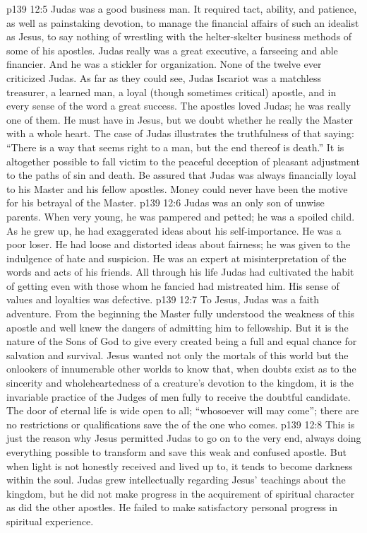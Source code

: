 \pc \vs p139 12:5 Judas was a good business man. It required tact, ability, and patience, as well as painstaking devotion, to manage the financial affairs of such an idealist as Jesus, to say nothing of wrestling with the helter\hyp{}skelter business methods of some of his apostles. Judas really was a great executive, a farseeing and able financier. And he was a stickler for organization. None of the twelve ever criticized Judas. As far as they could see, Judas Iscariot was a matchless treasurer, a learned man, a loyal (though sometimes critical) apostle, and in every sense of the word a great success. The apostles loved Judas; he was really one of them. He must have  in Jesus, but we doubt whether he really  the Master with a whole heart. The case of Judas illustrates the truthfulness of that saying: “There is a way that seems right to a man, but the end thereof is death.” It is altogether possible to fall victim to the peaceful deception of pleasant adjustment to the paths of sin and death. Be assured that Judas was always financially loyal to his Master and his fellow apostles. Money could never have been the motive for his betrayal of the Master.
\vs p139 12:6 Judas was an only son of unwise parents. When very young, he was pampered and petted; he was a spoiled child. As he grew up, he had exaggerated ideas about his self\hyp{}importance. He was a poor loser. He had loose and distorted ideas about fairness; he was given to the indulgence of hate and suspicion. He was an expert at misinterpretation of the words and acts of his friends. All through his life Judas had cultivated the habit of getting even with those whom he fancied had mistreated him. His sense of values and loyalties was defective.
\pc \vs p139 12:7 To Jesus, Judas was a faith adventure. From the beginning the Master fully understood the weakness of this apostle and well knew the dangers of admitting him to fellowship. But it is the nature of the Sons of God to give every created being a full and equal chance for salvation and survival. Jesus wanted not only the mortals of this world but the onlookers of innumerable other worlds to know that, when doubts exist as to the sincerity and wholeheartedness of a creature’s devotion to the kingdom, it is the invariable practice of the Judges of men fully to receive the doubtful candidate. The door of eternal life is wide open to all; “whosoever will may come”; there are no restrictions or qualifications save the  of the one who comes.
\vs p139 12:8 This is just the reason why Jesus permitted Judas to go on to the very end, always doing everything possible to transform and save this weak and confused apostle. But when light is not honestly received and lived up to, it tends to become darkness within the soul. Judas grew intellectually regarding Jesus’ teachings about the kingdom, but he did not make progress in the acquirement of spiritual character as did the other apostles. He failed to make satisfactory personal progress in spiritual experience.
